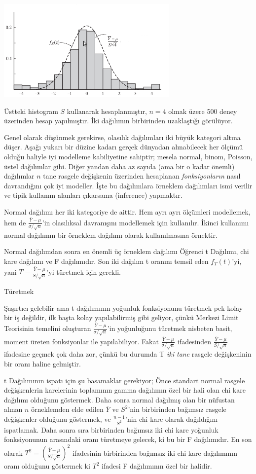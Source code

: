 \documentclass[12pt,fleqn]{article}\usepackage{../../common}
\begin{document}
\includegraphics[height=5cm]{stat_sampling_01.png}

Üstteki histogram $S$ kullanarak hesaplanmıştır, $n=4$ olmak üzere 500
deney üzerinden hesap yapılmıştır. İki dağılımın birbirinden uzaklaştığı
görülüyor. 

Genel olarak düşünmek gerekirse, olasılık dağılımları iki büyük kategori
altına düşer. Aşağı yukarı bir düzine kadarı gerçek dünyadan alınabilecek
her ölçümü olduğu haliyle iyi modelleme kabiliyetine sahiptir; mesela
normal, binom, Poisson, üstel dağılımlar gibi. Diğer yandan daha az sayıda
(ama bir o kadar önemli) dağılımlar $n$ tane rasgele değişkenin üzerinden
hesaplanan {\em fonksiyonların} nasıl davrandığını çok iyi modeller. İşte
bu dağılımlara örneklem dağılımları ismi verilir ve tipik kullanım alanları
çıkarsama (inference) yapmaktır.

Normal dağılımı her iki kategoriye de aittir. Hem ayrı ayrı ölçümleri
modellemek, hem de $\frac{\bar{Y}-\mu}{\sigma / \sqrt{n}}$'in olasılıksal
davranışını modellemek için kullanılır.  İkinci kullanımı normal dağılımın
bir örneklem dağılımı olarak kullanılmasına örnektir.

Normal dağılımdan sonra en önemli üç örneklem dağılımı Öğrenci t Dağılımı,
chi kare dağılımı ve F dağılımıdır. Son iki dağılım t oranını temsil eden
$f_T(t)$'yi, yani $T = \frac{\bar{Y}-\mu}{S / \sqrt{n}}$'yi türetmek için
gerekli.

Türetmek 

Şaşırtıcı gelebilir ama t dağılımının yoğunluk fonksiyonunu türetmek pek
kolay bir iş değildir, ilk başta kolay yapılabilirmiş gibi geliyor, çünkü
Merkezi Limit Teorisinin temelini oluşturan $\frac{\bar{Y}-\mu}{\sigma / \sqrt{n}}$'in 
yoğunluğunu türetmek nisbeten basit, moment üreten fonksiyonlar ile
yapılabiliyor. Fakat $\frac{\bar{Y}-\mu}{\sigma / \sqrt{n}}$ 
ifadesinden $\frac{\bar{Y}-\mu}{S / \sqrt{n}}$ ifadesine
geçmek çok daha zor, çünkü bu durumda T {\em iki tane} rasgele değişkeninin
bir oranı haline gelmiştir.

t Dağılımının ispatı için şu basamaklar gerekiyor; Önce standart normal
rasgele değişkenlerin karelerinin toplamının gamma dağılımın özel bir hali
olan chi kare dağılımı olduğunu göstermek. Daha sonra normal dağılmış olan
bir nüfustan alınan $n$ örneklemden elde edilen $\bar{Y}$ ve $S^2$'nin
birbirinden bağımsız rasgele değişkenler olduğunu göstermek, ve
$\frac{n-1}{S^2}$'nin chi kare olarak dağıldığını ispatlamak. Daha sonra
sıra birbirinden bağımsız iki chi kare yoğunluk fonksiyonunun arasındaki
oranı türetmeye gelecek, ki bu bir F dağılımıdır. En son olarak $T^2
=(\frac{\bar{Y}-\mu}{S / \sqrt{n}})^2$ ifadesinin 
birbirinden bağımsız iki chi kare dağılımının oranı olduğunu göstermek ki
$T^2$  ifadesi F dağılımının özel bir halidir.
\end{document}
